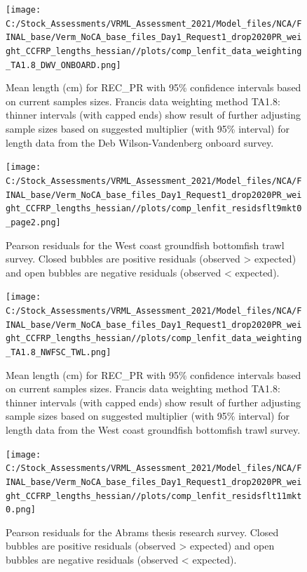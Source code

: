 \documentclass[11pt,
  english,
]{article}
\begin{document}
\begin{figure}
\centering
\texttt{[image: C:/Stock\_Assessments/VRML\_Assessment\_2021/Model\_files/NCA/FINAL\_base/Verm\_NoCA\_base\_files\_Day1\_Request1\_drop2020PR\_weight\_CCFRP\_lengths\_hessian//plots/comp\_lenfit\_data\_weighting\_TA1.8\_DWV\_ONBOARD.png]}
\caption{Mean length (cm) for REC\_PR with 95\% confidence intervals based on current samples sizes. Francis data weighting method TA1.8: thinner intervals (with capped ends) show result of further adjusting sample sizes based on suggested multiplier (with 95\% interval) for length data from the Deb Wilson-Vandenberg onboard survey.\label{fig:mean-len-fit-DWV-ONBOARD}}
\end{figure}

\begin{figure}
\centering
\texttt{[image: C:/Stock\_Assessments/VRML\_Assessment\_2021/Model\_files/NCA/FINAL\_base/Verm\_NoCA\_base\_files\_Day1\_Request1\_drop2020PR\_weight\_CCFRP\_lengths\_hessian//plots/comp\_lenfit\_residsflt9mkt0\_page2.png]}
\caption{Pearson residuals for the West coast groundfish bottomfish trawl survey. Closed bubbles are positive residuals (observed \textgreater{} expected) and open bubbles are negative residuals (observed \textless{} expected).\label{fig:len-pearson-NWFSC-TWL}}
\end{figure}

\begin{figure}
\centering
\texttt{[image: C:/Stock\_Assessments/VRML\_Assessment\_2021/Model\_files/NCA/FINAL\_base/Verm\_NoCA\_base\_files\_Day1\_Request1\_drop2020PR\_weight\_CCFRP\_lengths\_hessian//plots/comp\_lenfit\_data\_weighting\_TA1.8\_NWFSC\_TWL.png]}
\caption{Mean length (cm) for REC\_PR with 95\% confidence intervals based on current samples sizes. Francis data weighting method TA1.8: thinner intervals (with capped ends) show result of further adjusting sample sizes based on suggested multiplier (with 95\% interval) for length data from the West coast groundfish bottomfish trawl survey.\label{fig:mean-len-fit-NWFSC-TWL}}
\end{figure}

\begin{figure}
\centering
\texttt{[image: C:/Stock\_Assessments/VRML\_Assessment\_2021/Model\_files/NCA/FINAL\_base/Verm\_NoCA\_base\_files\_Day1\_Request1\_drop2020PR\_weight\_CCFRP\_lengths\_hessian//plots/comp\_lenfit\_residsflt11mkt0.png]}
\caption{Pearson residuals for the Abrams thesis research survey. Closed bubbles are positive residuals (observed \textgreater{} expected) and open bubbles are negative residuals (observed \textless{} expected).\label{fig:len-pearson-ABRAMS-RESEARCH}}
\end{figure}
\end{document}
